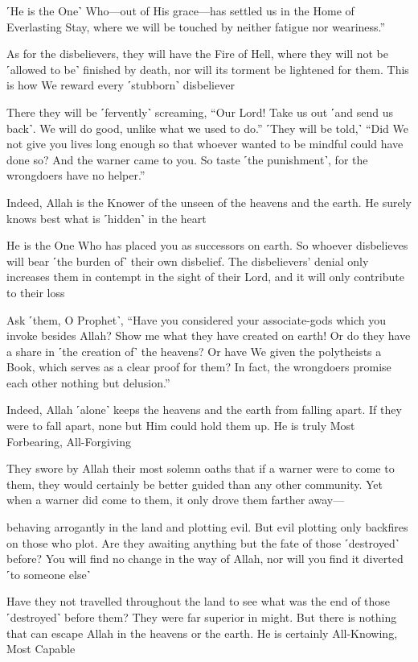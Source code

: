 ˹He is the One˺ Who—out of His grace—has settled us in the Home of Everlasting Stay, where we will be touched by neither fatigue nor weariness.”

As for the disbelievers, they will have the Fire of Hell, where they will not be ˹allowed to be˺ finished by death, nor will its torment be lightened for them. This is how We reward every ˹stubborn˺ disbeliever

There they will be ˹fervently˺ screaming, “Our Lord! Take us out ˹and send us back˺. We will do good, unlike what we used to do.” ˹They will be told,˺ “Did We not give you lives long enough so that whoever wanted to be mindful could have done so? And the warner came to you. So taste ˹the punishment˺, for the wrongdoers have no helper.”

Indeed, Allah is the Knower of the unseen of the heavens and the earth. He surely knows best what is ˹hidden˺ in the heart

He is the One Who has placed you as successors on earth. So whoever disbelieves will bear ˹the burden of˺ their own disbelief. The disbelievers’ denial only increases them in contempt in the sight of their Lord, and it will only contribute to their loss

Ask ˹them, O Prophet˺, “Have you considered your associate-gods which you invoke besides Allah? Show me what they have created on earth! Or do they have a share in ˹the creation of˺ the heavens? Or have We given the polytheists a Book, which serves as a clear proof for them? In fact, the wrongdoers promise each other nothing but delusion.”

Indeed, Allah ˹alone˺ keeps the heavens and the earth from falling apart. If they were to fall apart, none but Him could hold them up. He is truly Most Forbearing, All-Forgiving

They swore by Allah their most solemn oaths that if a warner were to come to them, they would certainly be better guided than any other community. Yet when a warner did come to them, it only drove them farther away—

behaving arrogantly in the land and plotting evil. But evil plotting only backfires on those who plot. Are they awaiting anything but the fate of those ˹destroyed˺ before? You will find no change in the way of Allah, nor will you find it diverted ˹to someone else˺

Have they not travelled throughout the land to see what was the end of those ˹destroyed˺ before them? They were far superior in might. But there is nothing that can escape Allah in the heavens or the earth. He is certainly All-Knowing, Most Capable

